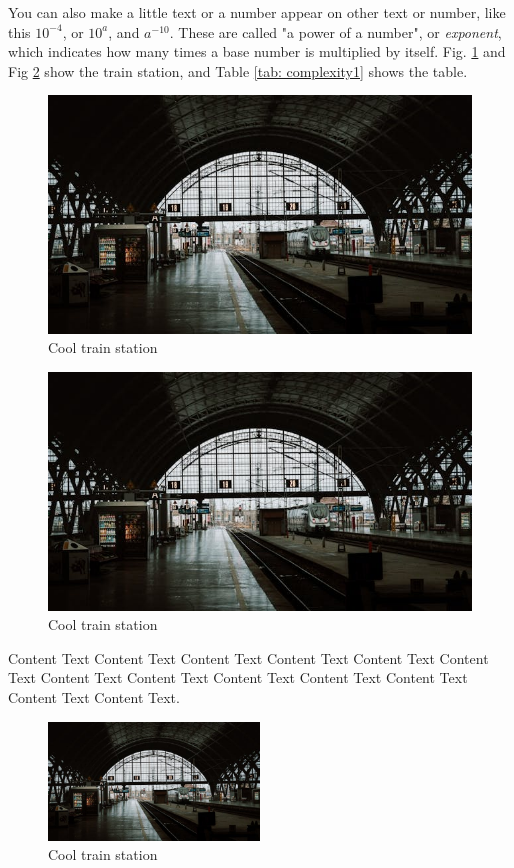 \begin{Chapter}
You can also make a little text or a number appear on other text or number, like this $10^{-4}$, or $10^{a}$, and $a^{-10}$. These are called "a power of a number", or \textit{exponent}, which indicates how many times a base number is multiplied by itself. Fig. \ref{fig: image1} and Fig \ref{fig: image2} show the train station, and Table \ref{tab: complexity1} shows the table.

\begin{figure}[htbp]
    \centering
    \includegraphics[width = 1\textwidth]{pics/image.jpeg}
    \caption{Cool train station}
    \label{fig: image1}
\end{figure}

\begin{figure}[htbp]
    \centering
    \includegraphics[width = 1\textwidth]{pics/image.jpeg}
    \caption{Cool train station}
    \label{fig: image2}
\end{figure}

Content Text Content Text Content Text Content Text Content Text Content Text Content Text Content Text Content Text Content Text Content Text Content Text Content Text.

\begin{figure}[htbp]
    \centering
    \includegraphics[width = 0.5\textwidth]{pics/image.jpeg}
    \caption{Cool train station}
    \label{fig: image}
\end{figure}

\end{Chapter}